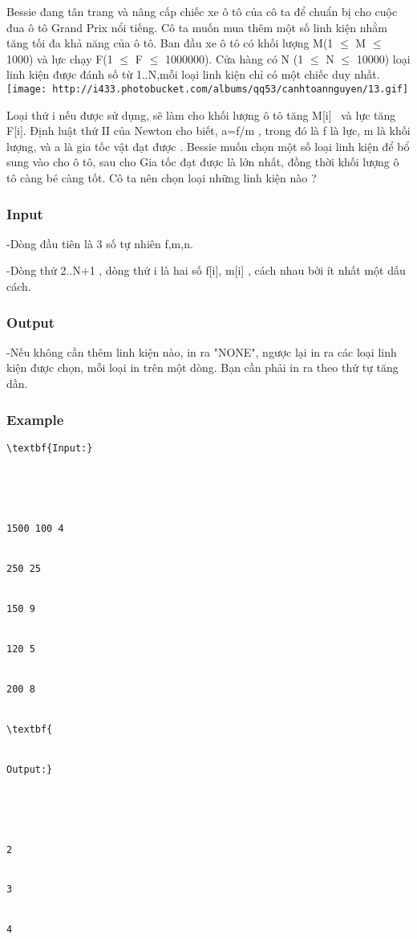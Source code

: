 



   Bessie đang tân trang và nâng cấp chiếc xe ô tô của cô ta để chuẩn bị cho cuộc đua ô tô Grand Prix nổi tiếng. Cô ta muốn mua thêm một số linh kiện nhằm tăng tối đa khả năng của ô tô. Ban đầu xe ô tô có khối lượng M(1 $\le$  M  $\le$ 1000) và lực chạy F(1 $\le$  F  $\le$ 1000000). Cửa hàng có N (1 $\le$  N  $\le$ 10000) loại linh kiện được đánh số từ 1..N,mỗi loại linh kiện chỉ có một chiếc duy nhất.   
\texttt{[image: http://i433.photobucket.com/albums/qq53/canhtoannguyen/13.gif]}

   Loại thứ i nếu được sử dụng, sẽ làm cho khối lượng ô tô tăng M[i]  và lực tăng F[i]. Định luật thứ II của Newton cho biết, a=f/m , trong đó là f là lực, m là khối lượng, và a là gia tốc vật đạt được . Bessie muốn chọn một số loại linh kiện để bổ sung vào cho ô tô, sau cho Gia tốc đạt được là lớn nhất, đồng thời khối lượng ô tô càng bé càng tốt. Cô ta nên chọn loại những linh kiện nào ?  

\subsubsection{   Input  }

   -Dòng đầu tiên là 3 số tự nhiên f,m,n.  

   -Dòng thứ 2..N+1 , dòng thứ i là hai số f[i], m[i] , cách nhau bởi ít nhất một dấu cách.  

\subsubsection{   Output  }

   -Nếu không cần thêm linh kiện nào, in ra "NONE", ngược lại in ra các loại linh kiện được chọn, mỗi loại in trên một dòng. Bạn cần phải in ra theo thứ tự tăng dần.  

\subsubsection{   Example  }
\begin{verbatim}
\textbf{Input:}





1500 100 4


250 25


150 9


120 5


200 8


\textbf{


Output:}





2


3


4


\end{verbatim}
